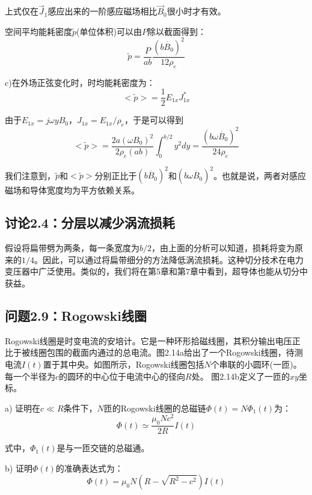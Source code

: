 上式仅在$\vec{J}_1$感应出来的一阶感应磁场相比$\vec{B}_0$很小时才有效。

空间平均能耗密度$\tilde{p}$(单位体积)可以由$P$除以截面得到：
\begin{equation*}
\tilde{p}=\frac{P}{ab}\frac{(b\dot{B_0})^2}{12\rho_e}  \tag{2.67}
\end{equation*}

c)在外场正弦变化时，时均能耗密度为：
\begin{equation*}
<\tilde{p}>=\frac{1}{2}E_{1x} J_{1x}^*  \tag{S8.3}
\end{equation*}

由于$E_{1x}=j\omega y B_0$，$J_{1x}=E_{1x}/\rho_e$，于是可以得到
\begin{equation*}
<\tilde{p}>=\frac{2a(\omega B_0)^2}{2\rho_e (ab)}\int_{0}^{b/2} y^2 dy=\frac{(b\omega\dot{B_0})^2}{24\rho_e}  \tag{2.68}
\end{equation*}

我们注意到，$\tilde{p}$和$<\tilde{p}>$分别正比于$(b\dot{B_0})^2$和$(b\omega \dot{B_0})^2$。也就是说，两者对感应磁场和导体宽度均为平方依赖关系。




\subsection{讨论2.4：分层以减少涡流损耗}
假设将扁带劈为两条，每一条宽度为$b/2$，由上面的分析可以知道，损耗将变为原来的$1/4$。因此，可以通过将扁带细分的方法降低涡流损耗。这种切分技术在电力变压器中广泛使用。类似的，我们将在第5章和第7章中看到，超导体也能从切分中获益。



\subsection{问题2.9：Rogowski线圈}
Rogowski线圈是时变电流的安培计。它是一种环形拾磁线圈，其积分输出电压正比于被线圈包围的截面内通过的总电流。图2.14a给出了一个Rogowski线圈，待测电流$I(t)$置于其中央。如图所示，Rogowski线圈包括$N$个串联的小圆环(一匝)。每一个半径为$c$的圆环的中心位于电流中心的径向$R$处。
图2.14b定义了一匝的$xy$坐标。

a) 证明在$c\ll R$条件下，$N$匝的Rogowski线圈的总磁链$\Phi(t)=N\Phi_1(t)$为：
\begin{equation}
\Phi(t)\simeq\frac{\mu_0 N c^2}{2R}I(t)
\end{equation}

式中，$\Phi_1(t)$是与一匝交链的总磁通。

b) 证明$\Phi(t)$的准确表达式为：
\begin{equation}
\Phi(t)=\mu_0 N (R-\sqrt{R^2-c^2})I(t)
\end{equation}

